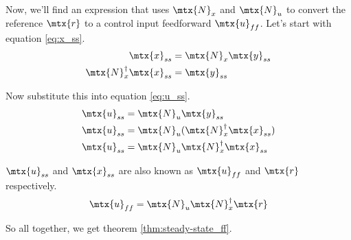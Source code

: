 Now, we'll find an expression that uses $\mtx{N}_x$ and $\mtx{N}_u$ to convert
the \gls{reference} $\mtx{r}$ to a \gls{control input} feedforward
$\mtx{u}_{ff}$. Let's start with equation \eqref{eq:x_ss}.
\begin{align*}
  \mtx{x}_{ss} &= \mtx{N}_x \mtx{y}_{ss} \\
  \mtx{N}_x^\dagger \mtx{x}_{ss} &= \mtx{y}_{ss}
\end{align*}

Now substitute this into equation \eqref{eq:u_ss}.
\begin{align*}
  \mtx{u}_{ss} &= \mtx{N}_u \mtx{y}_{ss} \\
  \mtx{u}_{ss} &= \mtx{N}_u (\mtx{N}_x^\dagger \mtx{x}_{ss}) \\
  \mtx{u}_{ss} &= \mtx{N}_u \mtx{N}_x^\dagger \mtx{x}_{ss}
\end{align*}

$\mtx{u}_{ss}$ and $\mtx{x}_{ss}$ are also known as $\mtx{u}_{ff}$ and $\mtx{r}$
respectively.
\begin{align*}
  \mtx{u}_{ff} = \mtx{N}_u \mtx{N}_x^\dagger \mtx{r}
\end{align*}

So all together, we get theorem \ref{thm:steady-state_ff}.

